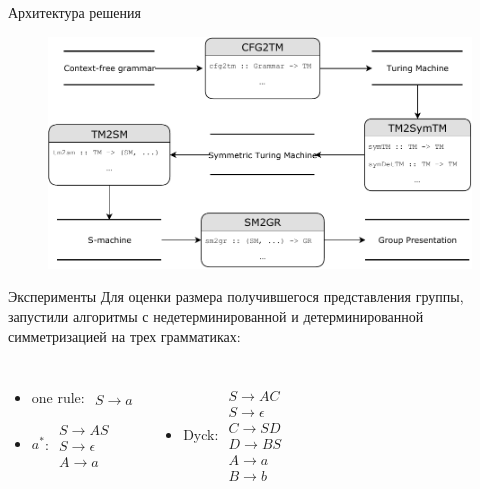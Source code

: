 \documentclass[xcolor=table]{beamer}
\begin{document}
\begin{frame}[fragile]{Архитектура решения}
\begin{figure}[H]
  \centering
  \includegraphics[width=120mm]{pictures/diplomaSmallUML.pdf}
 \end{figure}
\end{frame}

\begin{frame}[fragile]{Эксперименты}
Для оценки размера получившегося представления группы, запустили алгоритмы с недетерминированной и детерминированной симметризацией на трех грамматиках:
\begin{columns}[onlytextwidth,T]
        \begin{itemize}
    \item one rule: 
    $\begin{array}{lCr}
        \nonumber S \to a
    \end{array}$
    \newline
    \newline
    \item $a^*$:
    $\begin{array}{lCr}
        S \to AS \nonumber \\
        S \to \epsilon \\
        A \to a \nonumber
    \end{array}$
    \end{itemize}
    
        \begin{itemize}
            \item Dyck:
    $\begin{array}{lCr}
        S \to AC \nonumber \\
        S \to \epsilon \nonumber \\
        C \to SD \\
        D \to BS \nonumber \\
        A \to a \nonumber \\
        B \to b \nonumber
    \end{array}$
        \end{itemize}
    \end{columns}

\end{frame}
\end{document}
